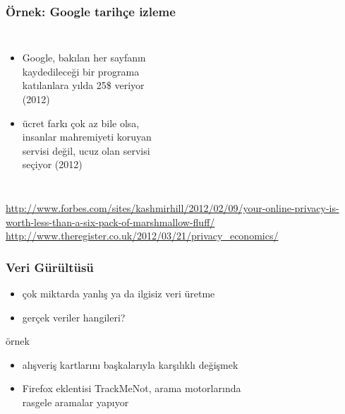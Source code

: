 \documentclass[dvipsnames]{beamer}
\theoremstyle{plain}
\begin{document}
\begin{frame}
  \frametitle{Örnek: Google tarihçe izleme}

  \begin{columns}

    \begin{itemize}
      \item Google, bakılan her sayfanın\\
        kaydedileceği bir programa\\
        katılanlara yılda 25\$ veriyor\\
        (2012)

      \medskip
      \item ücret farkı çok az bile olsa,\\
        insanlar mahremiyeti koruyan\\
        servisi değil, ucuz olan servisi\\
        seçiyor (2012)
    \end{itemize}
  \end{columns}

  \medskip
  \tiny{\url{http://www.forbes.com/sites/kashmirhill/2012/02/09/your-online-privacy-is-worth-less-than-a-six-pack-of-marshmallow-fluff/}}\\
  \tiny{\url{http://www.theregister.co.uk/2012/03/21/privacy_economics/}}\\
\end{frame}

\begin{frame}
  \frametitle{Veri Gürültüsü}

  \begin{itemize}
    \item çok miktarda yanlış ya da ilgisiz veri üretme
    \item gerçek veriler hangileri?
  \end{itemize}

  \begin{exampleblock}{örnek}
    \begin{itemize}
      \item alışveriş kartlarını başkalarıyla karşılıklı değişmek
      \item Firefox eklentisi TrackMeNot, arama motorlarında\\
        rasgele aramalar yapıyor
    \end{itemize}
  \end{exampleblock}
\end{frame}
\end{document}
